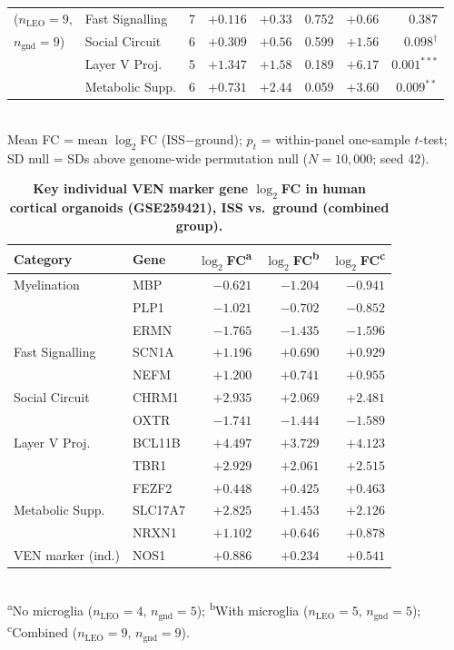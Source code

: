 \documentclass[11pt]{article}
\begin{document}
\begin{table}[t]
\begin{tabular}{llrrrrrr}
($n_\text{LEO}=9$,         & Fast Signalling   & 7 & $+0.116$ & $+0.33$ & 0.752 & $+0.66$ & 0.387 \\
$n_\text{gnd}=9$)          & Social Circuit    & 6 & $+0.309$ & $+0.56$ & 0.599 & $+1.56$ & $0.098^\dagger$ \\
                           & Layer V Proj.     & 5 & $+1.347$ & $+1.58$ & 0.189 & $+6.17$ & $0.001^{***}$ \\
                           & Metabolic Supp.   & 6 & $+0.731$ & $+2.44$ & 0.059 & $+3.60$ & $0.009^{**}$ \\
\bottomrule
\end{tabular}\\[2pt]
{\scriptsize Mean FC = mean $\log_2$FC (ISS$-$ground); $p_t$ = within-panel one-sample $t$-test; SD null = SDs above genome-wide permutation null ($N=10{,}000$; seed 42).}
\end{table}

\begin{table}[t]
\centering
\caption{\textbf{Key individual VEN marker gene $\log_2$FC in human
cortical organoids (GSE259421), ISS vs.\ ground (combined group).}}
\label{tab:genes}
\vspace{4pt}
\small
\setlength{\tabcolsep}{5pt}
\begin{tabular}{llrrr}
\toprule
\textbf{Category} & \textbf{Gene} &
\textbf{$\log_2$FC\textsuperscript{a}} &
\textbf{$\log_2$FC\textsuperscript{b}} &
\textbf{$\log_2$FC\textsuperscript{c}}\\
\midrule
Myelination       & MBP     & $-0.621$ & $-1.204$ & $-0.941$ \\
                  & PLP1    & $-1.021$ & $-0.702$ & $-0.852$ \\
                  & ERMN    & $-1.765$ & $-1.435$ & $-1.596$ \\
Fast Signalling   & SCN1A   & $+1.196$ & $+0.690$ & $+0.929$ \\
                  & NEFM    & $+1.200$ & $+0.741$ & $+0.955$ \\
Social Circuit    & CHRM1   & $+2.935$ & $+2.069$ & $+2.481$ \\
                  & OXTR    & $-1.741$ & $-1.444$ & $-1.589$ \\
Layer V Proj.     & BCL11B  & $+4.497$ & $+3.729$ & $+4.123$ \\
                  & TBR1    & $+2.929$ & $+2.061$ & $+2.515$ \\
                  & FEZF2   & $+0.448$ & $+0.425$ & $+0.463$ \\
Metabolic Supp.   & SLC17A7 & $+2.825$ & $+1.453$ & $+2.126$ \\
                  & NRXN1   & $+1.102$ & $+0.646$ & $+0.878$ \\
VEN marker (ind.) & NOS1    & $+0.886$ & $+0.234$ & $+0.541$ \\
\bottomrule
\end{tabular}\\[2pt]
{\scriptsize \textsuperscript{a}No microglia ($n_\text{LEO}=4$, $n_\text{gnd}=5$);\quad
\textsuperscript{b}With microglia ($n_\text{LEO}=5$, $n_\text{gnd}=5$);\quad
\textsuperscript{c}Combined ($n_\text{LEO}=9$, $n_\text{gnd}=9$).}
\end{table}
\end{document}
